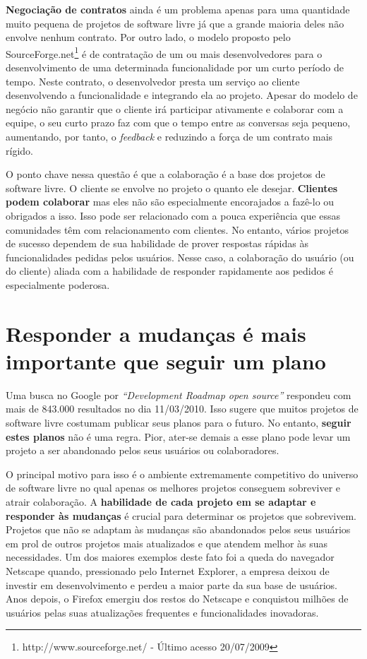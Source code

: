 \textbf{Negociação de contratos} ainda é um problema apenas para uma
quantidade muito pequena de projetos de software livre já que a grande
maioria deles não envolve nenhum contrato.  Por outro lado, o modelo
proposto pelo SourceForge.net\footnote{http://www.sourceforge.net/ -
  Último acesso 20/07/2009} é de contratação de um ou mais
desenvolvedores para o desenvolvimento de uma determinada
funcionalidade por um curto período de tempo. Neste contrato, o
desenvolvedor presta um serviço ao cliente desenvolvendo a
funcionalidade e integrando ela ao projeto. Apesar do modelo de
negócio não garantir que o cliente irá participar ativamente e
colaborar com a equipe, o seu curto prazo faz com que o tempo entre as
conversas seja pequeno, aumentando, por tanto, o \emph{feedback} e
reduzindo a força de um contrato mais rígido.

O ponto chave nessa questão é que a colaboração é a base dos projetos
de software livre.  O cliente se envolve no projeto o quanto ele
desejar. \textbf{Clientes podem colaborar} mas eles não são
especialmente encorajados a fazê-lo ou obrigados a isso. Isso pode ser
relacionado com a pouca experiência que essas comunidades têm com
relacionamento com clientes. No entanto, vários projetos de sucesso
dependem de sua habilidade de prover respostas rápidas às
funcionalidades pedidas pelos usuários. Nesse caso, a colaboração do
usuário (ou do cliente) aliada com a habilidade de responder
rapidamente aos pedidos é especialmente poderosa.

\section{Responder a mudanças é mais importante que seguir um plano}
\label{sec:fourth-princ}

Uma busca no Google por \emph{``Development Roadmap open source''}
respondeu com mais de 843.000 resultados no dia 11/03/2010. Isso
sugere que muitos projetos de software livre costumam publicar seus
planos para o futuro. No entanto, \textbf{seguir estes planos} não é
uma regra. Pior, ater-se demais a esse plano pode levar um projeto a
ser abandonado pelos seus usuários ou colaboradores.

O principal motivo para isso é o ambiente extremamente competitivo do
universo de software livre no qual apenas os melhores projetos
conseguem sobreviver e atrair colaboração. A \textbf{habilidade de
  cada projeto em se adaptar e responder às mudanças} é crucial para
determinar os projetos que sobrevivem.  Projetos que não se adaptam às
mudanças são abandonados pelos seus usuários em prol de outros
projetos mais atualizados e que atendem melhor às suas necessidades.
Um dos maiores exemplos deste fato foi a queda do navegador Netscape
quando, pressionado pelo Internet Explorer, a empresa deixou de
investir em desenvolvimento e perdeu a maior parte da sua base de
usuários. Anos depois, o Firefox emergiu dos restos do Netscape e
conquistou milhões de usuários pelas suas atualizações frequentes e
funcionalidades inovadoras.


